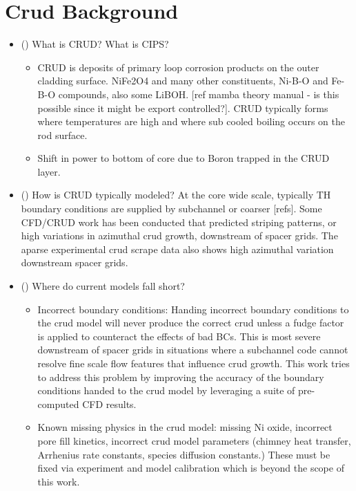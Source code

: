 


\section{Crud Background}

\begin{itemize}
        \item (\checkmark) What is CRUD?  What is CIPS?
                \begin{itemize}
                \item CRUD is deposits of primary loop corrosion products on the outer cladding surface.  NiFe2O4 and many other constituents, Ni-B-O and Fe-B-O compounds, also some LiBOH. [ref mamba theory manual - is this possible since it might be export controlled?].  CRUD  typically forms where temperatures are high and where sub cooled boiling occurs on the rod surface.
                \item Shift in power to bottom of core due to Boron trapped in the CRUD layer.
                \end{itemize}
        \item (\checkmark) How is CRUD typically modeled?  At the core wide scale, typically TH boundary conditions are supplied by subchannel or coarser [refs].  Some CFD/CRUD work has been conducted that predicted striping patterns, or high variations in azimuthal crud growth, downstream of spacer grids.  The aparse experimental crud scrape data also shows high azimuthal variation downstream spacer grids.
        \item (\checkmark) Where do current models fall short?
        \begin{itemize}
                \item Incorrect boundary conditions: Handing incorrect boundary conditions to the crud model will never produce the correct crud unless a fudge factor is applied to counteract the effects of bad BCs.  This is most severe downstream of spacer grids in situations where a subchannel code cannot resolve fine scale flow features that influence crud growth.  This work tries to address this problem by improving the accuracy of the boundary conditions handed to the crud model by leveraging a suite of pre-computed CFD results.
                \item Known missing physics in the crud model: missing Ni oxide, incorrect pore fill kinetics, incorrect crud model parameters (chimney heat transfer, Arrhenius rate constants, species diffusion constants.) These must be fixed via experiment and model calibration which is beyond the scope of this work.
        \end{itemize}
\end{itemize}

